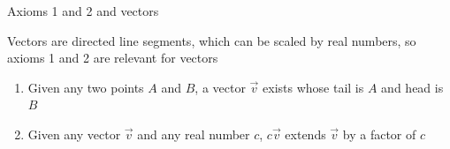 \documentclass[bigger]{beamer}
\begin{document}
\begin{frame}[label=sec-10]{Axioms 1 and 2 and vectors}
\begin{block}{Vectors are \alert{directed line segments}, which can be \alert{scaled by real numbers}, so axioms 1 and 2 are relevant for vectors}
\begin{enumerate}
\item Given any two points $A$ and $B$, a vector $\vec{v}$ exists whose tail is $A$ and head is $B$

\item Given any vector $\vec{v}$ and any real number $c$, $c\vec{v}$ extends $\vec{v}$ by a factor of $c$
\end{enumerate}

\begin{center}
\end{center}
\end{block}
\end{frame}
\end{document}
